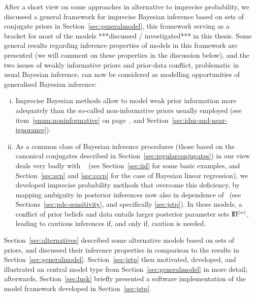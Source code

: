 After a short view on some approaches in alternative to imprecise probability,
we discussed a general framework for imprecise Bayesian inference
based on sets of conjugate priors in Section~\ref{sec:generalmodel},
this framework serving as a bracket for most of the models ***discussed / investigated*** in this thesis.
Some general results regarding inference properties of models
in this framework are presented (we will comment on these properties in the discussion below),
and the two issues of weakly informative priors and prior-data conflict,
problematic in usual Bayesian inference,
can now be considered as modelling opportunities of generalised Bayesian inference:
\begin{enumerate}[(i)]
\item Imprecise Bayesian methods allow to model weak prior information
more adequately than the so-called non-informative priors usually employed 
(see item~\ref{enum:noninformative} on page~\pageref{enum:noninformative}, and Section~\ref{sec:idm-and-near-ignorance}).
\item As a common class of Bayesian inference procedures
(those based on the canonical conjugates described in Section~\ref{sec:regularconjugates})
in our view deals very badly with \pdc\ %
(see Section~\ref{sec:iid} for some basic examples, and
Section~\ref{sec:scp} and \ref{sec:cccp} for the case of Bayesian linear regression),
we developed imprecise probability methods that overcome this deficiency,
by mapping ambiguity in posterior inferences now also in dependence of \pdc\ 
(see Sections~\ref{sec:pdc-sensitivity}, and specifically \ref{sec:jstp}).
In these models, a conflict of prior beliefs and data
entails larger posterior parameter sets $\text{I}\!\Pi^{(n)}$,
leading to cautious inferences if, and only if, caution is needed.
\end{enumerate}

Section~\ref{sec:alternatives} described some alternative models based on sets of priors,
and discussed their inference properties in comparison to the results in Section~\ref{sec:generalmodel}.
Section~\ref{sec:jstp} then motivated, developed, and illustrated
an central model type from Section~\ref{sec:generalmodel} in more detail;
afterwards, Section~\ref{sec:luck} briefly presented a software implementation
of the model framework developed in Section~\ref{sec:jstp}.

